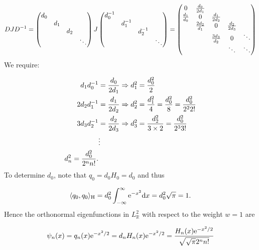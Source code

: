 \documentclass[12pt,a4paper]{article}
\def\D{ {\rm d} }
\def\E{ {\rm e} }
\def\dx{\D x}
\begin{document}
\[
DJD^{-1} = \begin{pmatrix}d_0 \\ & d_1 \\ &&d_2 \\&&&\ddots \end{pmatrix}  J \begin{pmatrix} d_0^{-1} \\ & d_1^{-1} \\ &&d_2^{-1} \\&&&\ddots \end{pmatrix} = \begin{pmatrix} 0 & {d_0 \over 2d_1} \\
{d_1 \over d_0} & 0 & {d_1 \over 2 d_2} \\
& {2d_2 \over d_1} & 0 & {d_2 \over 2 d_3} \\
&& {3d_3 \over d_2} & 0 & \ddots \\
&&& \ddots & \ddots
\end{pmatrix}
\]
We require:


\begin{align*}
d_1d_0^{-1} &= {d_0 \over 2 d_1} \Rightarrow d_1^2 = {d_0^2 \over 2} \\
2d_2d_1^{-1} &= {d_1 \over 2 d_2} \Rightarrow d_2^2 = {d_1^2 \over 4} = {d_0^2 \over 8} = {d_0^2 \over 2^2 2!} \\
3d_3d_2^{-1} &= {d_2 \over 2 d_3} \Rightarrow d_3^2 = {d_2^2 \over 3\times 2} = {d_0^2 \over 2^3 3!} \\
&\vdots \\
d_n^2 = {d_0^2 \over 2^n n!}.
\end{align*}
To determine $d_0$, note that $q_0 = d_0H_0 = d_0$ and thus

\[
\langle q_0, q_0 \rangle_{\rm H} =     d_0^2\int_{-\infty}^\infty \E^{-x^2} \dx = d_0^2\sqrt{\pi} = 1.
\]
Hence the orthonormal eigenfunctions in $L^2_{\mathbb{R}}$ with respect to the weight $w=1$ are

\[
    \psi_n(x) = q_n(x)\E^{-x^2/2} = d_n H_n(x)\E^{-x^2/2} = {H_n(x)\E^{-x^2/2}  \over \sqrt{\sqrt{\pi} 2^n n!} }
\]
\end{document}

